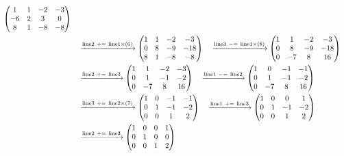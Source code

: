 \documentclass{ltjsarticle}
\begin{document}
\begin{align*}
\begin{pmatrix}
 1 & 1 & - 2 & - 3\\
 - 6 & 2 & 3 & 0\\
 8 & 1 & - 8 & - 8
\end{pmatrix}\allowdisplaybreaks\\
&\ \ \ \xrightarrow{ \text{line} 2 \ +=\  \text{line} 1 \times\left( 6 \right)} %
\begin{pmatrix}
 1 & 1 & - 2 & - 3\\
 0 & 8 & - 9 & - 18\\
 8 & 1 & - 8 & - 8
\end{pmatrix}
\ \ \ \xrightarrow{ \text{line} 3 \ -=\  \text{line} 1 \times\left( 8 \right)} %
\begin{pmatrix}
 1 & 1 & - 2 & - 3\\
 0 & 8 & - 9 & - 18\\
 0 & - 7 & 8 & 16
\end{pmatrix}\allowdisplaybreaks\\
&\ \ \ \xrightarrow{ \text{line} 2 \ +=\  \text{line} 3 } %
\begin{pmatrix}
 1 & 1 & - 2 & - 3\\
 0 & 1 & -1 & - 2\\
 0 & - 7 & 8 & 16
\end{pmatrix}\ \ \ \xrightarrow{ \text{line} 1 \ -=\  \text{line} 2 } %
\begin{pmatrix}
 1 & 0 & -1 & -1\\
 0 & 1 & -1 & - 2\\
 0 & - 7 & 8 & 16
\end{pmatrix}\allowdisplaybreaks\\
&\ \ \ \xrightarrow{ \text{line} 3 \ +=\  \text{line} 2 \times\left( 7 \right)} %
\begin{pmatrix}
 1 & 0 & -1 & -1\\
 0 & 1 & -1 & - 2\\
 0 & 0 & 1 & 2
\end{pmatrix}\ \ \ \xrightarrow{ \text{line} 1 \ +=\  \text{line} 3 } %
\begin{pmatrix}
 1 & 0 & 0 & 1\\
 0 & 1 & -1 & - 2\\
 0 & 0 & 1 & 2
\end{pmatrix}\allowdisplaybreaks\\
&\ \ \ \xrightarrow{ \text{line} 2 \ +=\  \text{line} 3 } %
\begin{pmatrix}
 1 & 0 & 0 & 1\\
 0 & 1 & 0 & 0\\
 0 & 0 & 1 & 2
\end{pmatrix}
\end{align*}
\end{document}
